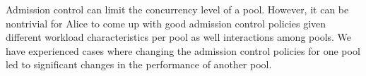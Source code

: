\vspace{1mm}
Admission control can limit the concurrency level of a pool. 
However, it can be nontrivial for Alice to come up with good
admission control policies given different workload characteristics
per pool as well interactions among pools. We have experienced cases 
where changing the admission control policies for one pool 
led to significant changes in the performance of another pool. 






